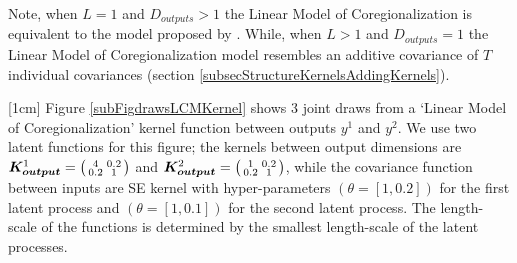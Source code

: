 Note, when $L = 1$ and $D_{outputs} > 1$ the Linear Model of Coregionalization is equivalent to the model proposed by \cite{bonilla2007multi}. While, when $L > 1$ and $D_{outputs} = 1$ the Linear Model of Coregionalization model resembles an additive covariance of $T$ individual covariances (section \ref{subsecStructureKernelsAddingKernels}).

[1cm]
Figure \ref{subFigdrawsLCMKernel} shows 3 joint draws from a `Linear Model of Coregionalization' kernel function between outputs $y^{1}$ and $y^{2}$. We use two latent functions for this figure; the kernels between output dimensions are $\boldsymbol{K_{output}}^{1} = \bigl( \begin{smallmatrix} 4 & 0.2\\ 0.2 & 1\end{smallmatrix}\bigr)$ and $\boldsymbol{K_{output}}^{2} = \bigl( \begin{smallmatrix} 1 & 0.2\\ 0.2 & 1\end{smallmatrix}\bigr)$, while the covariance function between inputs are SE kernel with hyper-parameters $(\theta = [1, 0.2])$ for the first latent process and $(\theta = [1, 0.1])$ for the second latent process. The length-scale of the functions is determined by the smallest length-scale of the latent processes.


